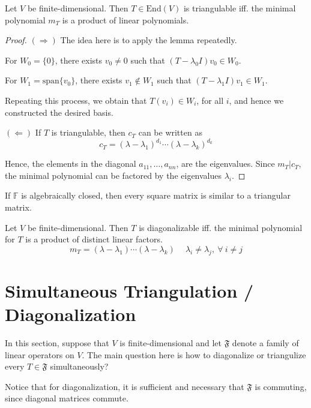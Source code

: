 \begin{theorem}
	Let $V$ be finite-dimensional. Then $T \in \text{End}(V)$ is triangulable iff. the minimal polynomial $m_T$ is a product of linear polynomials.
\end{theorem}

\begin{proof}
	$(\Rightarrow)$ The idea here is to apply the lemma repeatedly.

	For $W_0 = \{ 0 \}$, there exists $v_0 \neq 0$ such that $(T - \lambda_0 I)v_0 \in W_0$.

	For $W_1 = \text{span}\{ v_0 \}$, there exists $v_1 \notin W_1$ such that $(T - \lambda_1 I)v_1 \in W_1$.

	Repeating this process, we obtain that $T(v_i) \in W_i$, for all $i$, and hence we constructed the desired basis. 

	$(\Leftarrow)$ If $T$ is triangulable, then $c_T$ can be written as
	\[
		c_T = (\lambda - \lambda_1)^{d_1} \cdots (\lambda - \lambda_k)^{d_k}
	\]

	Hence, the elements in the diagonal $a_{11}, \ldots, a_{nn}$, are the eigenvalues. Since $m_T | c_T$, the minimal polynomial can be factored by the eigenvalues $\lambda_i$.
\end{proof}

\begin{corollary}
	If $\mathbb{F}$ is algebraically closed, then every square matrix is similar to a triangular matrix.
\end{corollary}

\begin{theorem}
	Let $V$ be finite-dimensional. Then $T$ is diagonalizable iff. the minimal polynomial for $T$ is a product of distinct linear factors.
	\[
		m_T = (\lambda - \lambda_1) \cdots (\lambda - \lambda_k) \quad ~\lambda_i \neq \lambda_j, ~\forall~i \neq j
	\]
\end{theorem}

\section{Simultaneous Triangulation / Diagonalization}

In this section, suppose that $V$ is finite-dimensional and let $\mathfrak{F}$ denote a family of linear operators on $V$. The main question here is how to diagonalize or triangulize every $T \in \mathfrak{F}$ simultaneously?

Notice that for diagonalization, it is sufficient and necessary that $\mathfrak{F}$ is commuting, since diagonal matrices commute.

